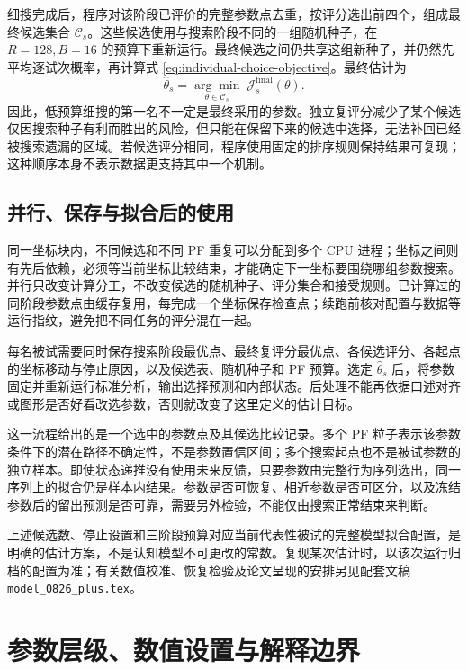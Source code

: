 \documentclass[12pt]{article}
\begin{document}
细搜完成后，程序对该阶段已评价的完整参数点去重，按评分选出前四个，组成最终候选集合 $\mathcal C_s$。这些候选使用与搜索阶段不同的一组随机种子，在 $R=128,B=16$ 的预算下重新运行。最终候选之间仍共享这组新种子，并仍然先平均逐试次概率，再计算式 \eqref{eq:individual-choice-objective}。最终估计为
\begin{equation}
\widehat\theta_s
=\underset{\theta\in\mathcal C_s}{\arg\min}\;
\mathcal J_s^{\mathrm{final}}(\theta).
\label{eq:final-subject-estimate}
\end{equation}
因此，低预算细搜的第一名不一定是最终采用的参数。独立复评分减少了某个候选仅因搜索种子有利而胜出的风险，但只能在保留下来的候选中选择，无法补回已经被搜索遗漏的区域。若候选评分相同，程序使用固定的排序规则保持结果可复现；这种顺序本身不表示数据更支持其中一个机制。

\subsection{并行、保存与拟合后的使用}

同一坐标块内，不同候选和不同 PF 重复可以分配到多个 CPU 进程；坐标之间则有先后依赖，必须等当前坐标比较结束，才能确定下一坐标要围绕哪组参数搜索。并行只改变计算分工，不改变候选的随机种子、评分集合和接受规则。已计算过的同阶段参数点由缓存复用，每完成一个坐标保存检查点；续跑前核对配置与数据等运行指纹，避免把不同任务的评分混在一起。

每名被试需要同时保存搜索阶段最优点、最终复评分最优点、各候选评分、各起点的坐标移动与停止原因，以及候选表、随机种子和 PF 预算。选定 $\widehat\theta_s$ 后，将参数固定并重新运行标准分析，输出选择预测和内部状态。后处理不能再依据口述对齐或图形是否好看改选参数，否则就改变了这里定义的估计目标。

这一流程给出的是一个选中的参数点及其候选比较记录。多个 PF 粒子表示该参数条件下的潜在路径不确定性，不是参数置信区间；多个搜索起点也不是被试参数的独立样本。即使状态递推没有使用未来反馈，只要参数由完整行为序列选出，同一序列上的拟合仍是样本内结果。参数是否可恢复、相近参数是否可区分，以及冻结参数后的留出预测是否可靠，需要另外检验，不能仅由搜索正常结束来判断。

上述候选数、停止设置和三阶段预算对应当前代表性被试的完整模型拟合配置，是明确的估计方案，不是认知模型不可更改的常数。复现某次估计时，以该次运行归档的配置为准；有关数值校准、恢复检验及论文呈现的安排另见配套文稿 \texttt{model\_0826\_plus.tex}。


\section{参数层级、数值设置与解释边界}
\end{document}
